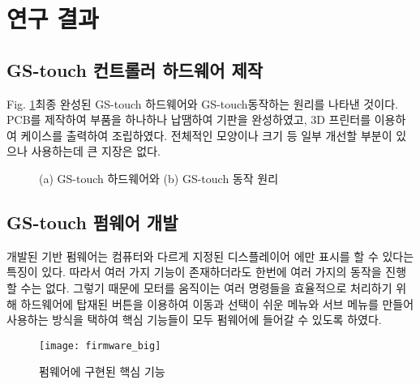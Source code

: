 \section{연구 결과}

\subsection{GS-touch 컨트롤러 하드웨어 제작}

Fig. \ref{fig:final_product_How_it_works_big}\는 최종 완성된 GS-touch 하드웨어와 GS-touch\가 동작하는 원리를  나타낸 것이다. PCB를 제작하여 부품을 하나하나 납땜하여 기판을 완성하였고, 3D 프린터를 이용하여 케이스를 출력하여 조립하였다. 전체적인 모양이나 크기 등 일부 개선할 부분이 있으나 사용하는데 큰 지장은 없다.

\begin{figure}[H]
	\begin{center}
		\caption{(a) GS-touch 하드웨어와 (b) GS-touch 동작 원리}
	\label{fig:final_product_How_it_works_big}
	\end{center}
\end{figure}

\subsection{GS-touch 펌웨어 개발}

개발된 기반 펌웨어는 컴퓨터와 다르게 지정된 디스플레이어 에만 표시를 할 수 있다는 특징이 있다. 따라서 여러 가지 기능이 존재하더라도 한번에 여러 가지의 동작을 진행할 수는 없다. 그렇기 때문에 모터를 움직이는 여러 명령들을 효율적으로 처리하기 위해 하드웨어에 탑재된 버튼을 이용하여 이동과 선택이 쉬운 메뉴와 서브 메뉴를 만들어 사용하는 방식을 택하여 핵심 기능들이 모두 펌웨어에 들어갈 수 있도록 하였다.

\begin{figure}[h]
	\begin{center}
		\texttt{[image: firmware\_big]}
	\end{center}
	\caption{펌웨어에 구현된 핵심 기능}
	\label{fig:firmware_big}
\end{figure}

